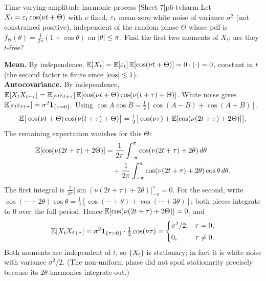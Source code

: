 \begin{exercise}{Time-varying-amplitude harmonic process \quad\textnormal{[Sheet 7]}}{p6-tvharm}
Let $X_t=\varepsilon_t\cos(\nu t+\Theta)$ with $\nu$ fixed, $\varepsilon_t$ mean-zero white
noise of variance $\sigma^2$ (not constrained positive), independent of the
random phase $\Theta$ whose pdf is
$f_\Theta(\theta)=\tfrac1{2\pi}(1+\cos\theta)$ on $\left\lvert \theta \right\rvert\le\pi$. Find the
first two moments of $X_t$; are they $t$-free?
\end{exercise}
\begin{solution}
\textbf{Mean.} By independence,
$\mathbb{E}[X_t]=\mathbb{E}[\varepsilon_t]\,\mathbb{E}[\cos(\nu t+\Theta)]=0\cdot(\cdot)=0$, constant in $t$
(the second factor is finite since $\left\lvert \cos \right\rvert\le1$).\\
\textbf{Autocovariance.} By independence,
$\mathbb{E}[X_tX_{t+\tau}]
=\mathbb{E}[\varepsilon_t\varepsilon_{t+\tau}]\,\mathbb{E}[\cos(\nu t+\Theta)\cos(\nu(t+\tau)+\Theta)]$.
White noise gives $\mathbb{E}[\varepsilon_t\varepsilon_{t+\tau}]=\sigma^2\mathbf{1}_{\{\tau=0\}}$. Using
$\cos A\cos B=\tfrac12[\cos(A-B)+\cos(A+B)]$,
\[
\mathbb{E}\big[\cos(\nu t+\Theta)\cos(\nu(t+\tau)+\Theta)\big]
=\tfrac12\big[\cos(\nu\tau)+\mathbb{E}[\cos(\nu(2t+\tau)+2\Theta)]\big].
\]
The remaining expectation vanishes for this $\Theta$:
\[
\begin{aligned}
\mathbb{E}[\cos(\nu(2t+\tau)+2\Theta)]
&=\frac1{2\pi}\int_{-\pi}^{\pi}\cos(\nu(2t+\tau)+2\theta)\,d\theta\\
&\quad+\frac1{2\pi}\int_{-\pi}^{\pi}\cos(\nu(2t+\tau)+2\theta)\cos\theta\,d\theta .
\end{aligned}
\]
The first integral is
$\tfrac1{4\pi}\big[\sin(\nu(2t+\tau)+2\theta)\big]_{-\pi}^{\pi}=0$.
For the second, write
$\cos(\cdots+2\theta)\cos\theta=\tfrac12[\cos(\cdots+\theta)+\cos(\cdots+3\theta)]$;
both pieces integrate to $0$ over the full period. Hence
$\mathbb{E}[\cos(\nu(2t+\tau)+2\Theta)]=0$, and
\[
\mathbb{E}[X_tX_{t+\tau}]=\sigma^2\mathbf{1}_{\{\tau=0\}}\cdot\tfrac12\cos(\nu\tau)
=\begin{cases}\sigma^2/2,&\tau=0,\\[2pt]0,&\tau\ne0.\end{cases}
\]
Both moments are independent of $t$, so $\{X_t\}$ is stationary; in fact it is
white noise with variance $\sigma^2/2$. (The non-uniform phase did not spoil
stationarity precisely because its $2\theta$-harmonics integrate out.)
\end{solution}

